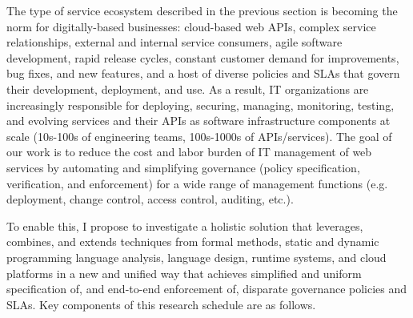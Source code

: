 The type of service ecosystem described in the previous section 
is becoming the norm for digitally-based
businesses: cloud-based web APIs, complex service relationships, external and
internal service consumers, agile software development, rapid release
cycles, constant customer demand for improvements, bug fixes, and
new features, and a host of diverse policies and SLAs that
govern their development, deployment, and use.  
As a result, IT organizations are increasingly responsible 
for deploying, securing, managing, monitoring, testing, and evolving services
and their APIs as software infrastructure components at scale (10s-100s
of engineering teams, 100s-1000s of APIs/services).  The goal of our work
is to reduce the cost and labor burden of IT management of web services
by automating and simplifying governance (policy specification, 
verification, and enforcement) for a wide range of management functions
(e.g. deployment, change control, access control, auditing, etc.).

To enable this, I propose to investigate
a holistic solution that leverages, combines, and extends techniques from 
formal methods, static and dynamic programming language analysis, 
language design, runtime systems, and cloud platforms in a new 
and unified way that achieves simplified and uniform specification of,
and end-to-end enforcement of, disparate governance policies and SLAs.
Key components of this research schedule are as follows.


